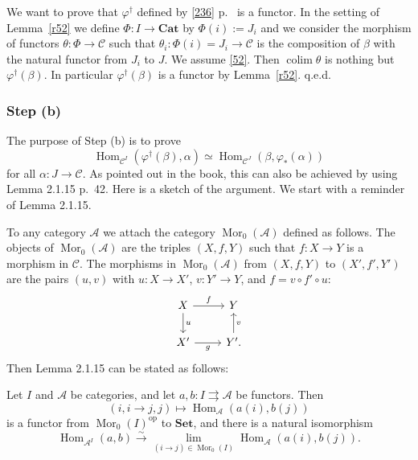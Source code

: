 \documentclass[12pt]{article}%
\theoremstyle{remark}
\theoremstyle{definition}
\newcommand{\A}{\mathcal A}
\newcommand{\C}{\mathcal C}
\newcommand{\Cat}{\mathbf{Cat}}%
\newcommand{\Set}{\mathbf{Set}}
\newcommand{\pp}{\varphi}
\newcommand{\parar}{\rightrightarrows}
\newcommand{\xr}{\xrightarrow}
\DeclareMathOperator*{\colim}{colim}
\DeclareMathOperator{\Hom}{Hom}%
\DeclareMathOperator{\Mor}{Mor}
\DeclareMathOperator{\op}{op}
\begin{document}
We want to prove that $\pp^\dagger$ defined by \eqref{236} p.~\pageref{236} is a functor. In the setting of Lemma~\ref{r52} we define $\Phi:I\to\Cat$ by $\Phi(i):=J_i$ and we consider the morphism of functors $\theta:\Phi\to\C$ such that $\theta_i:\Phi(i)=J_i\to\C$ is the composition of $\beta$ with the natural functor from $J_i$ to $J$. We assume \eqref{52}. Then $\colim\theta$ is nothing but $\varphi^\dagger(\beta)$. In particular $\varphi^\dagger(\beta)$ is a functor by Lemma~\ref{r52}. q.e.d.
%
\subsubsection{Step (b)}
%
The purpose of Step (b) is to prove 
%
\begin{equation}\label{stepb}
\Hom_{\C^I}(\varphi^\dagger(\beta),\alpha)\simeq\Hom_{\C^J}(\beta,\varphi_*(\alpha)) 
\end{equation} 
% 
for all $\alpha:J\to\C$. As pointed out in the book, this can also be achieved by using Lemma 2.1.15 p.~42. Here is a sketch of the argument. We start with a reminder of Lemma 2.1.15. 

To any category $\A$ we attach the category $\Mor_0(\A)$ defined as follows. The objects of $\Mor_0(\A)$ are the triples $(X,f,Y)$ such that $f:X\to Y$ is a morphism in $\C$. The morphisms in $\Mor_0(\A)$ from $(X,f,Y)$ to $(X',f',Y')$ are the pairs $(u,v)$ with $u:X\to X'$, $v:Y'\to Y$, and $f=v\circ f'\circ u$:
$$
\begin{tikzcd}
X\ar{d}{u}\ar{r}{f}&Y\\ 
X'\ar{r}[swap]{g}&Y'\ar{u}[swap]{v}.
\end{tikzcd}
$$ 
Then Lemma 2.1.15 can be stated as follows: 

Let $I$ and $\A$ be categories, and let $a,b:I\parar\A$ be functors. Then 
$$
(i,i\to j,j)\mapsto\Hom_\A(a(i),b(j))
$$ 
is a functor from $\Mor_0(I)^{\op}$ to $\Set$, and there is a natural isomorphism 
%
\begin{equation}\label{2115} 
\Hom_{\A^I}(a,b)\xr\sim\lim_{(i\to j)\in\Mor_0(I)}\Hom_\A(a(i),b(j)).
\end{equation}
%
\end{document}
